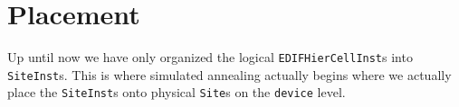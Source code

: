 
\section{Placement}
    \label{sec:placement}
    Up until now we have only organized the logical \texttt{EDIFHierCellInst}s into \texttt{SiteInst}s. 
    This is where simulated annealing actually begins where we actually place the \texttt{SiteInst}s onto physical \texttt{Site}s on the \texttt{device} level. 

